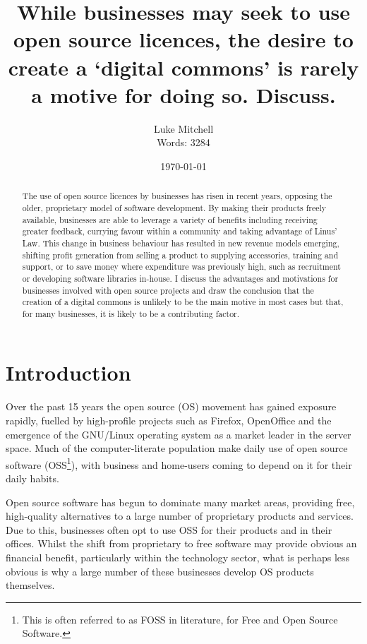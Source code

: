\documentclass[a4paper]{article}
\title{While businesses may seek to use open source licences, the desire to
create a ‘digital commons’ is rarely a motive for doing so. Discuss.}
\author{\begin{tabular}{r@{ }l} 
Luke Mitchell \\[1ex] 
Words: 3284
\end{tabular}}
\date{\today}
\begin{document}
\maketitle

\begin{abstract}
The use of open source licences by businesses has risen in recent years, opposing the older, proprietary model of software development. By making their products freely available, businesses are able to leverage a variety of benefits including receiving greater feedback, currying favour within a community and taking advantage of Linus’ Law. This change in business behaviour has resulted in new revenue models emerging, shifting profit generation from selling a product to supplying accessories, training and support, or to save money where expenditure was previously high, such as recruitment or developing software libraries in-house. I discuss the advantages and motivations for businesses involved with open source projects and draw the conclusion that the creation of a digital commons is unlikely to be the main motive in most cases but that, for many businesses, it is likely to be a contributing factor.
\end{abstract}

\section{Introduction}

Over the past 15 years the open source (OS) movement has gained exposure rapidly, fuelled by high-profile projects such as Firefox\cite{firefox}\cite{browserstats}, OpenOffice\cite{openoffice}\cite{osalternatives} and the emergence of the GNU/Linux operating system as a market leader in the server space\cite{websurvey}\cite{osusage}. Much of the computer-literate population make daily use of open source software\cite{commonsoftware}\cite{commonsoftware2} (OSS\footnote{This is often referred to as FOSS in literature, for Free and Open Source Software.}), with business and home-users coming to depend on it for their daily habits.

Open source software has begun to dominate many market areas, providing free, high-quality alternatives to a large number of proprietary products and services. Due to this, businesses often opt to use OSS for their products and in their offices. Whilst the shift from proprietary to free software may provide obvious an financial benefit, particularly within the technology sector\cite{buildessential}, what is perhaps less obvious is why a large number of these businesses develop OS products themselves.
\end{document}
